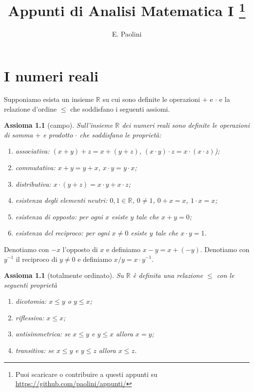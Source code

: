 \documentclass[italian,a4paper,oneside,headinclude]{scrbook}
\title{Appunti di Analisi Matematica I%
\thanks{%
Puoi scaricare o contribuire a questi appunti su
\url{https://github.com/paolini/appunti/}}}
\author{E. Paolini}
\newcommand{\RR}{\mathbb R}
\newtheorem{axiom}[theorem]{Assioma}
\begin{document}
\maketitle


\chapter{I numeri reali}

Supponiamo esista un insieme $\RR$ su cui sono definite le operazioni $+$ e $\cdot$
e la relazione d'ordine $\le$ che soddisfano i seguenti assiomi.

\begin{axiom}[campo]\label{axiom_field}
Sull'insieme $\RR$ dei numeri reali sono definite le operazioni di somma $+$ e
prodotto $\cdot$ che soddisfano le proprietà:
\begin{enumerate}
\item associativa: $(x+y)+z = x + (y+z)$, $(x\cdot y)\cdot z = x \cdot (x \cdot z)$);
\item commutativa: $x+y=y+x$, $x\cdot y = y \cdot x$;
\item distributiva: $x\cdot (y+z) = x\cdot y + x \cdot z$;
\item esistenza degli elementi neutri: $0,1\in \RR$,
$0\neq 1$, $0+x = x$, $1\cdot x = x$;
\item esistenza di opposto: per ogni $x$ esiste $y$ tale che $x+y = 0$;
\item esistenza del reciproco: per ogni $x\neq 0$ esiste $y$ tale che $x \cdot y = 1$.
\end{enumerate}
\end{axiom}

Denotiamo con $-x$ l'opposto di $x$ e definiamo $x-y = x+(-y)$.
Denotiamo con $y^{-1}$ il reciproco di $y\neq 0$ e
definiamo $x / y = x\cdot y^{-1}$.

\begin{axiom}[totalmente ordinato]\label{axiom_order}
Su $\RR$ è definita una relazione $\le$ con le seguenti proprietà
\begin{enumerate}
\item dicotomia: $x \le y$ o $y \le x$;
\item riflessiva: $x \le x$;
\item antisimmetrica: se $ x\le y$ e $y \le x$ allora $x=y$;
\item transitiva: se $x\le y $ e $ y \le z$ allora $x\le z$.
\end{enumerate}
\end{axiom}
\end{document}

